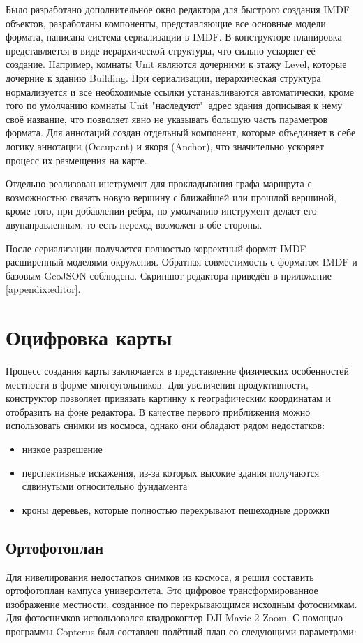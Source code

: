     Было разработано дополнительное окно редактора для быстрого создания IMDF объектов, разработаны компоненты, представляющие все основные модели формата, написана система сериализации в IMDF. В конструкторе планировка представляется в виде иерархической структуры, что сильно ускоряет её создание. Например, комнаты Unit являются дочерними к этажу Level, которые дочерние к зданию Building. При сериализации, иерархическая структура нормализуется и все необходимые ссылки устанавливаются автоматически, кроме того по умолчанию комнаты Unit "наследуют"\ адрес здания дописывая к нему своё название, что позволяет явно не указывать большую часть параметров формата. Для аннотаций создан отдельный компонент, которые объединяет в себе логику аннотации (Occupant) и якоря (Anchor), что значительно ускоряет процесс их размещения на карте.

    Отдельно реализован инструмент для прокладывания графа маршрута с возможностью связать новую вершину с ближайшей или прошлой вершиной, кроме того, при добавлении ребра, по умолчанию инструмент делает его двунаправленным, то есть переход возможен в обе стороны.

    После сериализации получается полностью корректный формат IMDF расширенный моделями окружения. Обратная совместимость с форматом IMDF и базовым GeoJSON соблюдена. Скриншот редактора приведён в приложение \ref{appendix:editor}.

  \section{Оцифровка карты}
    Процесс создания карты заключается в представление физических особенностей местности в форме многоугольников. Для увеличения продуктивности, конструктор позволяет привязать картинку к географическим координатам и отобразить на фоне редактора. В качестве первого приближения можно использовать снимки из космоса, однако они обладают рядом недостатков:
    \begin{itemize}
      \item низкое разрешение
      \item перспективные искажения, из-за которых высокие здания получаются сдвинутыми относительно фундамента
      \item кроны деревьев, которые полностью перекрывают пешеходные дорожки
    \end{itemize}

    \subsection{Ортофотоплан}
      Для нивелирования недостатков снимков из космоса, я решил составить ортофотоплан кампуса университета. Это цифровое трансформированное изображение местности, созданное по перекрывающимся исходным фотоснимкам. Для фотоснимков использовался квадрокоптер DJI Mavic 2 Zoom.
      С помощью программы Copterus \cite{Copterus} был составлен полётный план со следующими параметрами:

